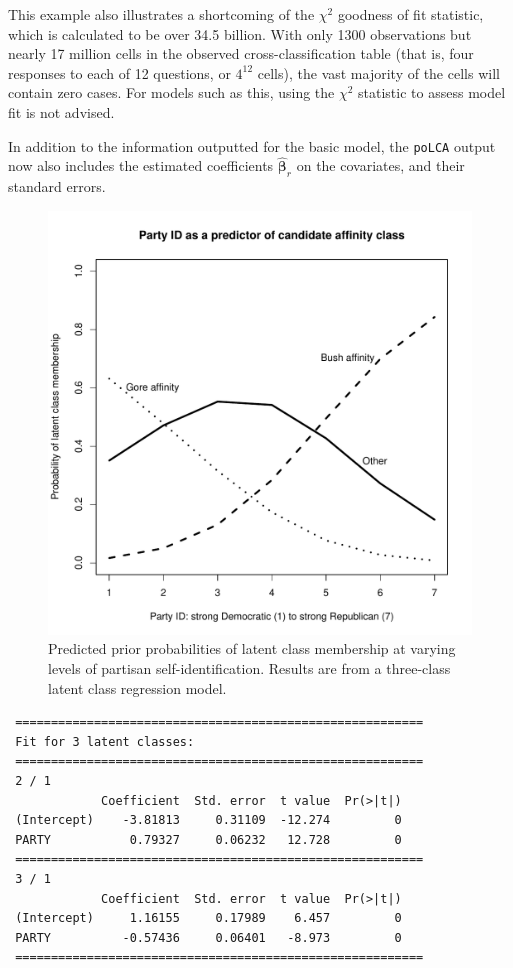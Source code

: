 \documentclass[letterpaper,12pt]{article}
\begin{document}
This example also illustrates a shortcoming of the $\chi^2$ goodness of fit statistic, which is calculated to be over 34.5 billion.  With only 1300 observations but nearly 17 million cells in the observed cross-classification table (that is, four responses to each of 12 questions, or $4^{12}$ cells), the vast majority of the cells will contain zero cases.  For models such as this, using the $\chi^2$ statistic to assess model fit is not advised.

In addition to the information outputted for the basic model, the \texttt{poLCA} output now also includes the estimated coefficients $\boldsymbol{\hat \beta}_r$ on the covariates, and their standard errors.

\begin{figure}
\centering \includegraphics[scale=0.5]{election.pdf}
\caption{Predicted prior probabilities of latent class membership at varying levels of partisan self-identification. Results are from a three-class latent class regression model.}
\label{f.election}
\end{figure}

\begin{verbatim}
 =========================================================
 Fit for 3 latent classes:
 =========================================================
 2 / 1
             Coefficient  Std. error  t value  Pr(>|t|)
 (Intercept)    -3.81813     0.31109  -12.274         0
 PARTY           0.79327     0.06232   12.728         0
 =========================================================
 3 / 1
             Coefficient  Std. error  t value  Pr(>|t|)
 (Intercept)     1.16155     0.17989    6.457         0
 PARTY          -0.57436     0.06401   -8.973         0
 =========================================================
\end{verbatim}
\end{document}

